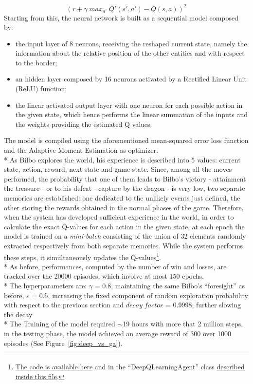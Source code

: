 $$(r+\gamma\;max_{a'}\;Q'(s',a')-Q(s,a))^2$$
Starting from this, the neural network is built as a sequential model composed by:
\begin{itemize}[noitemsep, topsep=0ex]
  \item the input layer of 8 neurons, receiving the reshaped current state, namely the information about the relative position of the other entities and with respect to the border;
  \item an hidden layer composed by 16 neurons activated by a Rectified Linear Unit (ReLU) function; 
  \item the linear activated output layer with one neuron for each possible action in the given state, which hence performs the linear summation of the inputs and the weights  providing the estimated Q values.
\end{itemize}
The model is compiled using the aforementioned mean-squared error loss function and the Adaptive Moment Estimation as optimizer.\\*
As Bilbo explores the world, his experience is described into 5 values: current state, action, reward, next state and game state. Since, among all the moves performed, the probability that one of them leads to Bilbo's victory - attainment the treasure - or to his defeat - capture by the dragon - is very low, two separate memories are established: one dedicated to the unlikely events just defined, the other storing the rewards obtained in the normal phases of the game. Therefore, when the system has developed sufficient experience in the world, in order to calculate the exact Q-values for each action in the given state, at each epoch the model is trained on a \textit{mini-batch} consisting of the union of 32 elements randomly extracted respectively from both separate memories. While the system performs these steps, it simultaneously updates the Q-values\footnote{\href{https://github.com/moiraghif/DragonHunting/blob/master/Bilbo\%20World/Bilbo_deep_feels.py}{The code is available here} and in the ``DeepQLearningAgent'' class \href{https://github.com/moiraghif/DragonHunting/blob/master/Bilbo\%20World/agents.py}{described inside this file}.}.\\*
As before, performances, computed by the number of win and losses, are tracked over the 20000 episodes, which involve at most 150 epochs.\\*
The hyperparameters are:
$\gamma$ = 0.8, maintaining the same Bilbo's ``foresight'' as before,
$\varepsilon$ = 0.5, increasing the fixed component of random exploration probability with respect to the previous section and
$decay\;factor$ = 0.9998, further slowing the decay\\*
The Training of the model required $\sim$19 hours with more that 2 million steps, in the testing phase, the model achieved an average reward of 300 over 1000 episodes (See Figure~\ref{fig:deep_vs_ga}).

